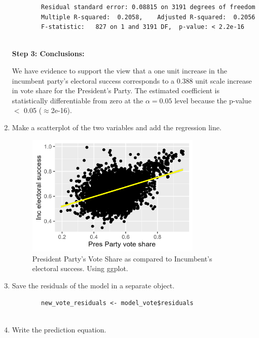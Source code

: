 \documentclass[12pt,letterpaper]{article}
\begin{document}
\begin{enumerate}
\begin{verbatim}
		Residual standard error: 0.08815 on 3191 degrees of freedom
		Multiple R-squared:  0.2058,	Adjusted R-squared:  0.2056 
		F-statistic:   827 on 1 and 3191 DF,  p-value: < 2.2e-16
		
	\end{verbatim}
	
	\textbf{Step 3: Conclusions:}
	
	We have evidence to support the view that a one unit increase in the incumbent party's electoral success corresponds to a 0.388 unit scale increase in vote share for the President's Party. The estimated coefficient is statistically differentiable from zero at the $\alpha=0.05$ level because the p-value $<$ 0.05 ($\approx $2e-16). \\
	
	
	\item Make a scatterplot of the two variables and add the regression line. 	
	
	  
	
	\begin{figure}[h!]
		\centering
		\caption{\footnotesize President Party's Vote Share as compared to Incumbent's electoral success. Using ggplot.}
		\includegraphics[width=0.79\textwidth]{vote_share2_scatter.png}
		
	\end{figure} 
	
	\newpage
	
	\item Save the residuals of the model in a separate object.	
	
	\begin{verbatim}
		new_vote_residuals <- model_vote$residuals
		
	\end{verbatim}
	
	
	\item Write the prediction equation.
	
\end{enumerate}		
\end{document}
